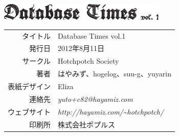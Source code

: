 \documentclass[b5paper,papersize,tombow,11pt]{jsbook}
\begin{document}
\vspace*{70mm}

\begin{center}
 \includegraphics[width=8cm]{hayamiz/images/colophon.eps}
 \par\vspace*{1mm}
 \begin{tabular}{rl}
  \hline
  タイトル & Database Times vol.1 \\
  発行日 & 2012年8月11日 \\
  サークル & Hotchpotch Society \\
  著者 & はやみず、hogelog、suu-g、yuyarin \\
  表紙デザイン & Eliza \\
  連絡先 & {\it yuto+c82@hayamiz.com} \\
  ウェブサイト & {\it http://hayamiz.com/\~{}hotchpotch/} \\
  印刷所 & 株式会社ポプルス \\
  \hline
 \end{tabular}
\end{center}
\end{document}
